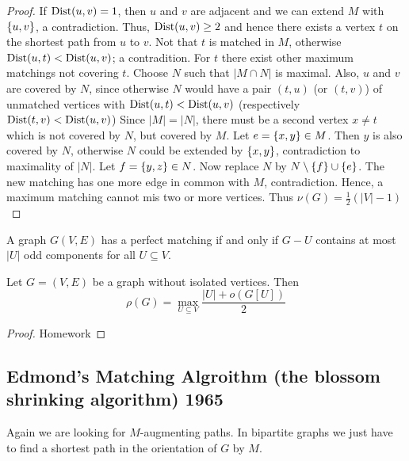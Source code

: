 \begin{proof}
	If $\operatorname{Dist}(u,v)=1$, then $u$ and $v$ are adjacent and we can extend $M$ with 
	$\left\{u,v\right\}$, a contradiction. Thus, $\operatorname{Dist}(u,v)\geq 2$ and hence there 
	exists a vertex $t$ on the shortest path from $u$ to $v$. Not that $t$ is 
	matched in $M$, otherwise $\operatorname{Dist}(u,t)<\operatorname{Dist}(u,v)$; a contradition.	For $t$ 
	there exist other maximum matchings not covering $t$. Choose $N$ such that 
	$|M \cap N|$ is maximal. \newline
	Also, $u$ and $v$ are covered by $N$, since otherwise $N$ would have a pair
	$(t,u)$ (or $(t,v)$) of unmatched vertices with $\operatorname{Dist}(u,t) < \operatorname{Dist} (u,v)$ 
	(respectively $\operatorname{Dist}(t,v) < \operatorname{Dist}(u,v)$)\newline	
	Since $|M| = |N|$, there must be a second vertex $x\neq t$ which is not
	covered by $N$, but covered by $M$. Let $e=\left\{x,y\right\} \in M$. Then $y$ is
	also covered by $N$, otherwise $N$ could be extended by $\left\{x,y\right\}$, 
	contradiction to maximality of $|N|$. Let $f=\left\{y,z\right\}\in N$. Now
	replace $N$ by $N \setminus \left\{f\right\} \cup \left\{e\right\}$. The new matching 
	has one more edge in common with $M$, contradiction. \newline
	Hence, a maximum matching cannot mis two or more vertices. Thus $\nu (G) = 
	\frac12(|V|-1)$
	

	
\end{proof}

\begin{cor}
	A graph $G(V,E)$ has a perfect matching if and only if $G - U$ contains at
	most $|U|$ odd components for all $U \subseteq V$.
\end{cor}

\begin{cor}
	Let $G = (V,E)$ be a graph without isolated vertices. Then \[
		\rho(G) = \max_{U \subseteq V} \frac{|U| + o(G[U])}2
	\]
\end{cor}

\begin{proof}
	Homework
\end{proof}

\subsection*{Edmond's Matching Algroithm (the blossom shrinking algorithm) 1965}
	Again we are looking for $M$-augmenting paths. In bipartite graphs we just have 
	to find a shortest path in the orientation of $G$ by $M$. 
	
